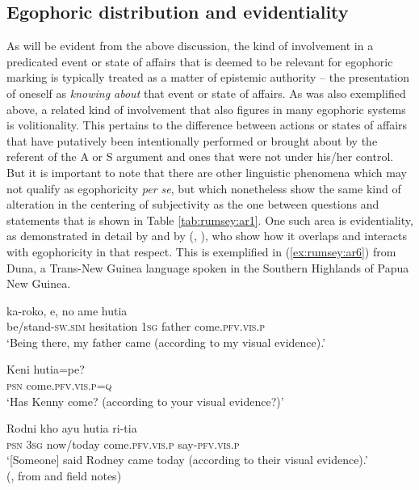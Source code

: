 \documentclass[output=paper]{langsci/langscibook}
\begin{document}
\subsection{Egophoric distribution and evidentiality}\label{s:ar2-1}

As will be evident from the above discussion, the kind of involvement in a predicated event or state of affairs that is deemed to be relevant for egophoric marking is typically treated as a matter of epistemic authority – the presentation of oneself as \textit{knowing about} that event or state of affairs. As was also exemplified above, a related kind of involvement that also figures in many egophoric systems is volitionality. This pertains to the difference between actions or states of affairs that have putatively been intentionally performed or brought about by the referent of the A or S argument and ones that were not under his/her control. But it is important to note that there are other linguistic phenomena which may not qualify as egophoricity \textit{per se}, but which nonetheless show the same kind of alteration in the centering of subjectivity as the one between questions and statements that is shown in Table \ref{tab:rumsey:ar1}. One such area is evidentiality, as demonstrated in detail by \cite{Aikhenvald2004} and by \citeauthor{SanRoque2015} (\citealt{SanRoque2015}, \citealt{SanRoqueSchieffelin2018}), who show how it overlaps and interacts with egophoricity in that respect.  This is exemplified in (\ref{ex:rumsey:ar6}) from Duna, a Trans-New Guinea language spoken in the Southern Highlands of Papua New Guinea.

\begin{exe}
	\ex \label{ex:rumsey:ar6}
	\begin{xlist}
		\ex \label{ex:rumsey:ar6a}
		\gll ka-roko, e, no ame hutia\\
		be/stand-\textsc{sw}.\textsc{sim} hesitation 1\textsc{sg} father come.\textsc{pfv}.\textsc{vis}.\textsc{p}\\
		\trans ‘Being there, my father came (according to my visual evidence).’

		\ex \label{ex:rumsey:ar6b}
		\gll Keni hutia=pe?\\
		\textsc{psn} come.\textsc{pfv}.\textsc{vis}.\textsc{p}=\textsc{q}\\
		\trans ‘Has Kenny come? (according to your visual evidence?)’
		
		\ex \label{ex:rumsey:ar6c}
		\gll Rodni kho ayu hutia ri-tia\\
		\textsc{psn} 3\textsc{sg} now/today come.\textsc{pfv}.\textsc{vis}.\textsc{p} say-\textsc{pfv}.\textsc{vis}.\textsc{p}\\
		\trans ‘[Someone] said Rodney came today (according to their visual evidence).’ \\(\citealt[56]{SanRoqueSchieffelin2018}, from \citealt{SanRoque2008} and field notes)
	\end{xlist}	
\end{exe}
\end{document}
